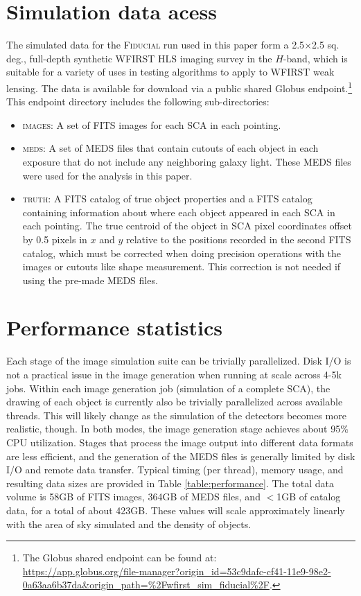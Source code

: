 \documentclass[aps,prd, amsmath,amssymb,superscriptaddress,showkeys,nofootinbib,reprint,preprintnumbers]{revtex4-1}
\begin{document}
\section{Simulation data acess}
\label{app:data_access}

The simulated data for the \textsc{Fiducial} run used in this paper form a 2.5$\times$2.5 sq. deg., full-depth synthetic WFIRST HLS imaging survey in the $H$-band, which is suitable for a variety of uses in testing algorithms to apply to WFIRST weak lensing. The data is available for download via a public shared Globus endpoint.\footnote{The Globus shared endpoint can be found at: \\\url{https://app.globus.org/file-manager?origin_id=53c9dafc-cf41-11e9-98e2-0a63aa6b37da&origin_path=\%2Fwfirst_sim_fiducial\%2F}.}  This endpoint directory includes the following sub-directories:

\begin{itemize}
\item \textsc{images}: A set of FITS images for each SCA in each pointing. 
\item \textsc{meds}: A set of MEDS files that contain cutouts of each object in each exposure that do not include any neighboring galaxy light. These MEDS files were used for the analysis in this paper. 
\item \textsc{truth}: A FITS catalog of true object properties and a FITS catalog containing information about where each object appeared in each SCA in each pointing. The true centroid of the object in SCA pixel coordinates offset by 0.5 pixels in $x$ and $y$ relative to the positions recorded in the second FITS catalog, which must be corrected when doing precision operations with the images or cutouts like shape measurement. This correction is not needed if using the pre-made MEDS files.
\end{itemize}


\section{Performance statistics}
\label{app:performance}

Each stage of the image simulation suite can be trivially parallelized. Disk I/O is not a practical issue in the image generation when running at scale across 4-5k jobs. Within each image generation job (simulation of a complete SCA), the drawing of each object is currently also be trivially parallelized across available threads. This will likely change as the simulation of the detectors becomes more realistic, though. In both modes, the image generation stage achieves about 95\% CPU utilization. Stages that process the image output into different data formats are less efficient, and the generation of the MEDS files is generally limited by disk I/O and remote data transfer. Typical timing (per thread), memory usage, and resulting data sizes are provided in Table \ref{table:performance}. The total data volume is 58GB of FITS images, 364GB of MEDS files, and $<$1GB of catalog data, for a total of about 423GB. These values will scale approximately linearly with the area of sky simulated and the density of objects.
\end{document}
